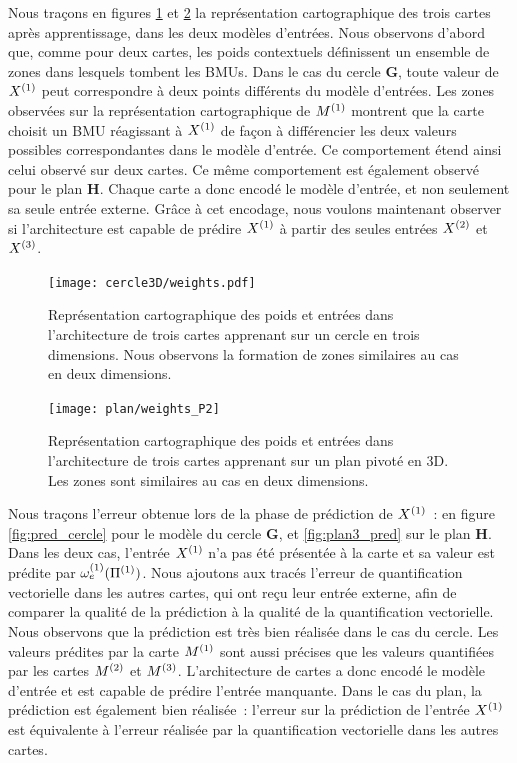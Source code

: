 \documentclass[../main]{subfiles}
\begin{document}
Nous traçons en figures \ref{fig:w_cercle} et \ref{fig:w_plan3} la représentation cartographique des trois cartes après apprentissage, dans les deux modèles d'entrées.
Nous observons d'abord que, comme pour deux cartes, les poids contextuels définissent un ensemble de zones dans lesquels tombent les BMUs.
Dans le cas du cercle \textbf{G}, toute valeur de $X^{({1})}$ peut correspondre à deux points différents du modèle d'entrées.
Les zones observées sur la représentation cartographique de $M^{({1})}$ montrent que la carte choisit un BMU réagissant à $X^{({1})}$ de façon à différencier les deux valeurs possibles correspondantes dans le modèle d'entrée. 
Ce comportement étend ainsi celui observé sur deux cartes.
Ce même comportement est également observé pour le plan \textbf{H}.
Chaque carte a donc encodé le modèle d'entrée, et non seulement sa seule entrée externe.
Grâce à cet encodage, nous voulons maintenant observer si l'architecture est capable de prédire $X^{({1})}$ à partir des seules entrées $X^{({2})}$ et $X^{({3})}$.


\begin{figure}[h!]
	\centering\texttt{[image: cercle3D/weights.pdf]}
	\caption{Représentation cartographique des poids et entrées dans l'architecture de trois cartes apprenant sur un cercle en trois dimensions. Nous observons la formation de zones similaires au cas en deux dimensions. \label{fig:w_cercle}}
\end{figure}

\begin{figure}[h!]
	\centering\texttt{[image: plan/weights\_P2]}
	\caption{Représentation cartographique des poids et entrées dans l'architecture de trois cartes apprenant sur un plan pivoté en 3D. Les zones sont similaires au cas en deux dimensions. \label{fig:w_plan3}}
\end{figure}


Nous traçons l'erreur obtenue lors de la phase de prédiction de $X^{({1})}$~: en figure \ref{fig:pred_cercle} pour le modèle du cercle \textbf{G}, et \ref{fig:plan3_pred} sur le plan \textbf{H}.
Dans les deux cas, l'entrée $X^{({1})}$ n'a pas été présentée à la carte et sa valeur est prédite par $\omega_{e}^{({1})}(\Pi^{({1})})$. 
Nous ajoutons aux tracés l'erreur de quantification vectorielle dans les autres cartes, qui ont reçu leur entrée externe, afin de comparer la qualité de la prédiction à la qualité de la quantification vectorielle.
Nous observons que la prédiction est très bien réalisée dans le cas du cercle. Les valeurs prédites par la carte $M^{({1})}$ sont aussi précises que les valeurs quantifiées par les cartes $M^{({2})}$ et $M^{({3})}$.
L'architecture de cartes a donc encodé le modèle d'entrée et est capable de prédire l'entrée manquante.
Dans le cas du plan, la prédiction est également bien réalisée~: l'erreur sur la prédiction de l'entrée $X^{({1})}$ est équivalente à l'erreur réalisée par la quantification vectorielle dans les autres cartes.
\end{document}

